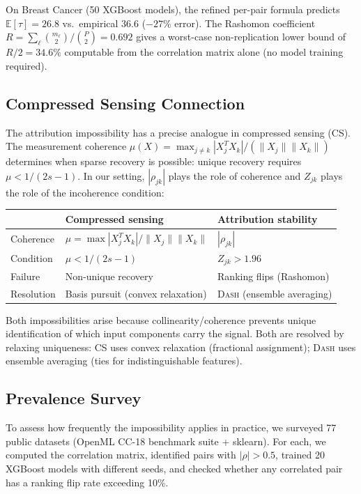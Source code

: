 \documentclass{article}
\newcommand{\E}{\mathbb{E}}
\newcommand{\DASH}{\textsc{Dash}}
\begin{document}
On Breast Cancer (50 XGBoost models), the refined per-pair formula predicts $\E[\tau] = 26.8$ vs.\ empirical $36.6$ ($-27\%$ error). The Rashomon coefficient $R = \sum_\ell \binom{m_\ell}{2}/\binom{P}{2} = 0.692$ gives a worst-case non-replication lower bound of $R/2 = 34.6\%$ computable from the correlation matrix alone (no model training required).

\subsection{Compressed Sensing Connection}

The attribution impossibility has a precise analogue in compressed sensing (CS). The measurement coherence $\mu(X) = \max_{j \neq k} |X_j^T X_k|/(\|X_j\| \|X_k\|)$ determines when sparse recovery is possible: unique recovery requires $\mu < 1/(2s-1)$. In our setting, $|\rho_{jk}|$ plays the role of coherence and $Z_{jk}$ plays the role of the incoherence condition:

\begin{center}
\small
\begin{tabular}{@{}lll@{}}
\toprule
& \textbf{Compressed sensing} & \textbf{Attribution stability} \\
\midrule
Coherence & $\mu = \max |X_j^T X_k|/\|X_j\|\|X_k\|$ & $|\rho_{jk}|$ \\
Condition & $\mu < 1/(2s{-}1)$ & $Z_{jk} > 1.96$ \\
Failure & Non-unique recovery & Ranking flips (Rashomon) \\
Resolution & Basis pursuit (convex relaxation) & \DASH{} (ensemble averaging) \\
\bottomrule
\end{tabular}
\end{center}

Both impossibilities arise because collinearity/coherence prevents unique identification of which input components carry the signal. Both are resolved by relaxing uniqueness: CS uses convex relaxation (fractional assignment); \DASH{} uses ensemble averaging (ties for indistinguishable features).

\subsection{Prevalence Survey}
\label{sec:prevalence}

To assess how frequently the impossibility applies in practice, we surveyed 77 public datasets (OpenML CC-18 benchmark suite + sklearn). For each, we computed the correlation matrix, identified pairs with $|\rho| > 0.5$, trained 20 XGBoost models with different seeds, and checked whether any correlated pair has a ranking flip rate exceeding 10\%.
\end{document}
